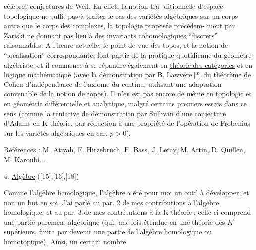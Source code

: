 
célèbres conjectures de Weil. En effet, la notion tra-%
ditionnelle d'espace topologique ne suffit pas à traiter
le cas des variétés algébriques sur un corps autre que
le corps des complexes, la topologie proposée précédem-%
ment par Zariski ne donnant pas lieu à des invariants
cohomologiques ``discrets'' raisonnables. A l'heure actuelle,
le point de vue des topos, et la notion de ``localisation''
correspondante, font partie de la pratique quotidienne
du géomètre algébriste, et il commence à se répandre
également en \uline{théorie des catégories} et en \uline{logique}
\uline{mathématique} (avec la démonstration par B. Lawvere [*]
du théorème de Cohen d'indépendance de l'axiome du
continu, utilisant une adaptation convenable de la notion
de topos). Il n'en est pas encore de même en topologie
et en géométrie différentielle et analytique, malgré
certains premiers essais dans ce sens (comme la tentative
de démonstration par Sullivan d'une conjecture d'Adams
en K-théorie, par réduction à une propriété de l'opération
de Frobenius sur les variétés algébriques en car. $p > 0$).

\uline{Références} : M. Atiyah, F. Hirzebruch, H. Bass, J. Leray,
M. Artin, D. Quillen, M. Karoubi...

4. \uline{Algèbre} ([15],[16],[18])

Comme l'algèbre homologique, l'algèbre a été
pour moi un outil à développer, et non un but en soi.
J'ai parlé au par. 2 de mes contributions à l'algèbre
homologique, et au par. 3 de mes contributions à la
K-théorie ; celle-ci comprend une partie purement
algébrique (qui, une fois étendue en une théorie des $K^{i}$
supérieurs, finira par devenir une partie de l'algèbre
homologique ou homotopique). Ainsi, un certain nombre

